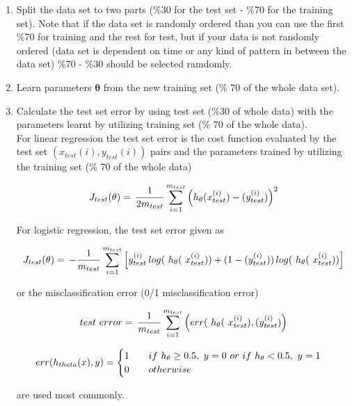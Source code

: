  \begin{enumerate}
 
  \item Split the data set to two parts (\%30 for the test set - \%70 for the training set). 
  Note that if the data set is randomly ordered than you can use the first \%70 for training and the rest for test, but if your data is not randomly ordered (data set is dependent on time or any kind of pattern in between the data set) \%70 - \%30 should be selected ramdomly.
  
  \item Learn parameters $\bm{\theta}$ from the new training set (\% 70 of the whole data set).

  \item Calculate the test set error by using test set (\%30 of whole data) with the parameters learnt by utilizing training set (\% 70 of the whole data).\\
  For linear regression the test set error is the cost function evaluated by the test set $(x_{test}(i), y_{test}(i))$ pairs and the parameters trained by utilizing the training set (\% 70 of the whole data)
	
	\begin{equation}{\label{eqn:costFuncTest}}
	J_{test}(\theta)
	=\,
	\frac{1}{2m_{test}} \sum\limits_{i=1}^{m_{test}} \Big(h_\theta(x_{test}^{(i)}) - (y_{test}^{(i)})\Big)^2  
	\end{equation} 
	
	For logistic regression, the test set error given as
	
	\begin{equation}{\label{eqn:costFuncLogisticRegressionModified}}
	J_{test}(\theta)
	=\,
	-\frac{1}{m_{test}} \sum\limits_{i=1}^{m_{test}} \Big[y_{test}^{(i)}\,log(\ h_\theta(\ x_{test}^{(i)})) + (1-(y_{test}^{(i)}))\,log(\ h_\theta(\ x_{test}^{(i)}))\Big]
	\end{equation} 
	
	or the misclassification error (0/1 misclassification error)
	
	\begin{equation}{\label{eqn:errorMisclassificationError}}
	 test\ error
	=\,
	\frac{1}{m_{test}} \sum\limits_{i=1}^{m_{test}} \Big(err(\ h_\theta(\ x_{test}^{(i)}), (y_{test}^{(i)})\Big)  
	\end{equation} 

	\begin{equation}{\label{eqn:misclassificationError}}
	  err(h_{theta}(x),y)=\begin{cases}
               1 \qquad if\ h_{\theta}\geq0.5,\ y=0 \ or\ if \ h_{\theta} < 0.5, \ y=1\\
               0 \qquad otherwise\\
            \end{cases}
	\end{equation} 

are used most commonly.
\end{enumerate}

